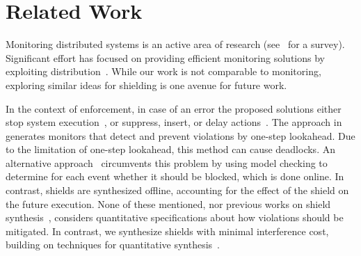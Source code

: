 \section{Related Work}
\label{sec_relatedl}
Monitoring distributed systems is an active area of research (see~\cite{FrancalanzaPS18} for a survey).
Significant effort has focused on providing efficient monitoring solutions by exploiting distribution~\cite{FalconeJNBB15,FrancalanzaS15,BauerF16}. While our work is not comparable to monitoring, exploring similar ideas for shielding is one avenue for future work.

In the context of enforcement, in case of an error the proposed solutions either stop system execution~\cite{Schneider00}, or suppress, insert, or delay actions~\cite{LigattiBW09,FalconeFM12}. The approach in~\cite{LuoR13} generates monitors that detect  and prevent violations by one-step lookahead. Due to the limitation of one-step lookahead, this method can cause deadlocks. An alternative approach~\cite{ZhangW14} circumvents this problem by using model checking to determine for each  event whether it should be blocked, which is done online. In contrast, shields are synthesized offline, accounting for the effect of the shield on the future execution.
%
None of these mentioned, nor previous works on shield synthesis~\cite{BloemKKW15,KonighoferABHKT17}, considers quantitative specifications about how violations should be mitigated. In contrast, we synthesize shields with minimal interference cost, building on techniques for quantitative synthesis~\cite{jing2013}.

%



